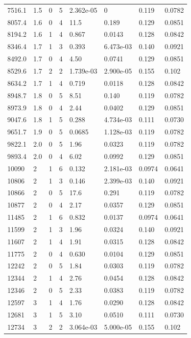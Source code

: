 \documentclass[preview]{standalone}
\begin{document}
{{{\begin{tabular}{L{1.2cm}C{1.2cm} C{0.3cm}C{0.5cm} C{1.4cm}C{1.4cm} C{1.4cm}C{1.4cm}}
  7516.1  &   1.5  & 0     &  5 &  2.362e-05  & 0  & 0.119 &  0.0782   \\ 
  8057.4  &   1.6  & 0     &  4 &  11.5  & 0.189  & 0.129 &  0.0851   \\ 
  8194.2  &   1.6  & 1     &  4 &  0.867  & 0.0143  & 0.128 &  0.0842   \\ 
  8346.4  &   1.7  & 1     &  3 &  0.393  & 6.473e-03  & 0.140 &  0.0921   \\ 
  8492.0  &   1.7  & 0     &  4 &  4.50  & 0.0741  & 0.129 &  0.0851   \\ 
  8529.6  &   1.7  & 2     &  2 &  1.739e-03  & 2.900e-05  & 0.155 &  0.102   \\ 
  8634.2  &   1.7  & 1     &  4 &  0.719  & 0.0118  & 0.128 &  0.0842   \\ 
  8948.7  &   1.8  & 0     &  5 &  8.51  & 0.140  & 0.119 &  0.0782   \\ 
  8973.9  &   1.8  & 0     &  4 &  2.44  & 0.0402  & 0.129 &  0.0851   \\ 
  9047.6  &   1.8  & 1     &  5 &  0.288  & 4.734e-03  & 0.111 &  0.0730   \\ 
  9651.7  &   1.9  & 0     &  5 &  0.0685  & 1.128e-03  & 0.119 &  0.0782   \\ 
  9822.1  &   2.0  & 0     &  5 &  1.96  & 0.0323  & 0.119 &  0.0782   \\ 
  9893.4  &   2.0  & 0     &  4 &  6.02  & 0.0992  & 0.129 &  0.0851   \\ 
  10090  &     2  & 1     &  6 &  0.132  & 2.181e-03  & 0.0974 &  0.0641   \\ 
  10806  &     2  & 1     &  3 &  0.146  & 2.399e-03  & 0.140 &  0.0921   \\ 
  10866  &     2  & 0     &  5 &  17.6  & 0.291  & 0.119 &  0.0782   \\ 
  10877  &     2  & 0     &  4 &  2.17  & 0.0357  & 0.129 &  0.0851   \\ 
  11485  &     2  & 1     &  6 &  0.832  & 0.0137  & 0.0974 &  0.0641   \\ 
  11599  &     2  & 1     &  3 &  1.96  & 0.0324  & 0.140 &  0.0921   \\ 
  11607  &     2  & 1     &  4 &  1.91  & 0.0315  & 0.128 &  0.0842   \\ 
  11775  &     2  & 0     &  4 &  0.630  & 0.0104  & 0.129 &  0.0851   \\ 
  12242  &     2  & 0     &  5 &  1.84  & 0.0303  & 0.119 &  0.0782   \\ 
  12344  &     2  & 1     &  4 &  2.76  & 0.0454  & 0.128 &  0.0842   \\ 
  12346  &     2  & 0     &  5 &  2.33  & 0.0383  & 0.119 &  0.0782   \\ 
  12597  &     3  & 1     &  4 &  1.76  & 0.0290  & 0.128 &  0.0842   \\ 
  12681  &     3  & 1     &  5 &  3.10  & 0.0510  & 0.111 &  0.0730   \\ 
  12734  &     3  & 2     &  2 &  3.064e-03  & 5.000e-05  & 0.155 &  0.102   \\ 
\hline 
\end{tabular} 

}}}
\end{document}
